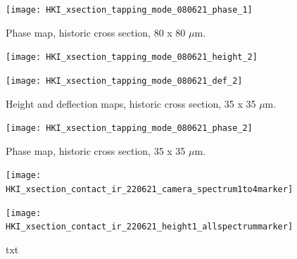 \begin{figure}[H]
\centering
  \texttt{[image: HKI\_xsection\_tapping\_mode\_080621\_phase\_1]}
\caption[Phase map, historic cross section]{Phase map, historic cross section, 80 x 80 $\mu$m.}
\label{fig:afm_xsection_phase_1}
\end{figure}


\begin{figure}[H]
\centering
\begin{minipage}{.45\textwidth}
  \centering
  \texttt{[image: HKI\_xsection\_tapping\_mode\_080621\_height\_2]}
\end{minipage}
\begin{minipage}{.45\textwidth}
  \centering
  \texttt{[image: HKI\_xsection\_tapping\_mode\_080621\_def\_2]}
\end{minipage}
\caption[Height and deflection maps, historic cross section]{Height and deflection maps, historic cross section, 35 x 35 $\mu$m.}
\label{fig:afm_xsection_height_def_2}
\end{figure}

\begin{figure}[H]
\centering
  \texttt{[image: HKI\_xsection\_tapping\_mode\_080621\_phase\_2]}
\caption[Phase map, historic cross section]{Phase map, historic cross section, 35 x 35 $\mu$m.}
\label{fig:afm_xsection_phase_2}
\end{figure}



\begin{figure}[H]
\centering
\begin{minipage}{.45\textwidth}
  \centering
  \texttt{[image: HKI\_xsection\_contact\_ir\_220621\_camera\_spectrum1to4marker]}
\end{minipage}
\begin{minipage}{.45\textwidth}
  \centering
  \texttt{[image: HKI\_xsection\_contact\_ir\_220621\_height1\_allspectrummarker]}
\end{minipage}
\caption[txt]{txt}
\label{fig:afm_xsection_camera_speclocs_height_1}
\end{figure}



